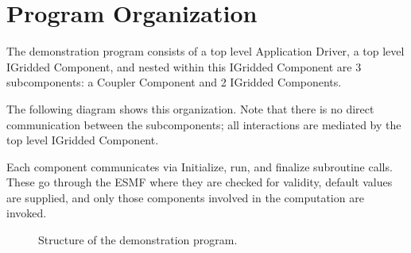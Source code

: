 
\section{Program Organization}

The demonstration program consists of a top level Application
Driver, a top level IGridded Component, and nested within this IGridded
Component are 3 subcomponents: a Coupler Component and 2 IGridded Components.

The following diagram shows this organization.  Note that there
is no direct communication between the subcomponents; all
interactions are mediated by the top level IGridded Component.

Each component communicates via Initialize, run, and finalize
subroutine calls.  These go through the ESMF where
they are checked for validity, default values are supplied,
and only those components involved in the computation are
invoked.


\begin{figure}[bpht]
\caption[Components]{Structure of the demonstration program.}
\label{fig:democomps}
\begin{center}
\end{center}
\end{figure}


